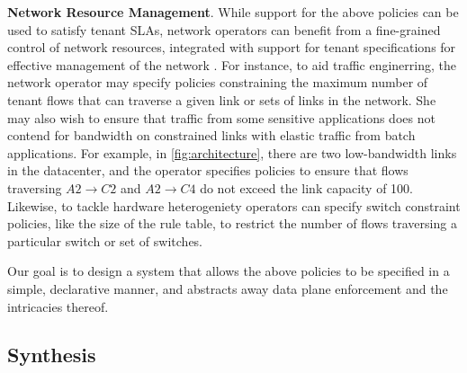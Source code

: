 \textbf{Network Resource Management}. While support for the above
policies can be used to satisfy tenant SLAs, network operators can
benefit from a fine-grained control of network resources, integrated
with support for tenant specifications for effective management of the
network
. For instance, to aid traffic enginerring, the network
operator may specify policies constraining the maximum number of
tenant flows that can traverse a given link or sets of links in the
network. She may also wish to ensure that traffic from some sensitive
applications does not contend for bandwidth on constrained links with
elastic traffic from batch applications. For example, in \cref{fig:architecture},
there are two low-bandwidth links in the datacenter, and the operator
specifies policies to ensure that flows traversing $A2 \rightarrow C2$ 
and $A2 \rightarrow C4$ do not exceed the link capacity of 100.
  Likewise, to tackle hardware heterogeniety operators can specify
  switch constraint policies, like the size of the rule table, to
  restrict the number of flows traversing a particular switch or set
  of switches.

  Our goal is to design a system that allows the above policies to be
  specified in a simple, declarative manner, and abstracts away 
  data plane enforcement and the intricacies thereof.
  
\subsection{Synthesis} \label{sec:synthesis} 

